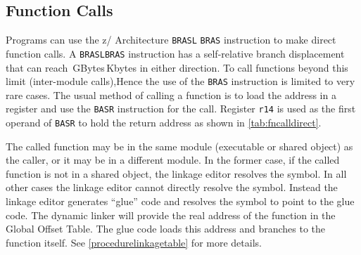\documentclass[english,11pt,twoside,toc=bib,toc=idx]{scrreprt}
\newcommand{\ARCH}{z/\kern-1pt Ar\-chi\-tec\-ture}
\newcommand{\ARCH}{ESA/390}
\begin{document}
\subsection{Function Calls}
Programs can use the \ARCH{} {\ifzseries\texttt{BRASL}\else
  \texttt{BRAS}\fi} instruction to make direct function calls.
A {\ifzseries \texttt{BRASL}\else \texttt{BRAS}\fi} instruction has a
self-relative branch displacement that can reach {$\,$GBytes$\,$Kbytes\fi} in either direction.  {\ifzseries
  To call functions beyond this limit (inter-module calls),\else Hence
  the use of the \texttt{BRAS} instruction is limited to very rare
  cases.  The usual method of calling a function is to\fi} load the
address in a register and use the \texttt{BASR} instruction for the
call.  Register \texttt{r14} is used as the first operand of \texttt{BASR}
to hold the return address as shown in \cref{tab:fncalldirect}.

The called function may be in the same module (executable or shared
object) as the caller, or it may be in a different module.  In the
former case, if the called function is not in a shared object, the
linkage editor resolves the symbol.  In all other cases the linkage
editor cannot directly resolve the symbol.  Instead the linkage editor
generates ``glue'' code and resolves the symbol to point to the glue
code.  The dynamic linker will provide the real address of the
function in the Global Offset Table.  The glue code loads this address
and branches to the function itself.  See
\cref{procedurelinkagetable} for more details.
\end{document}
